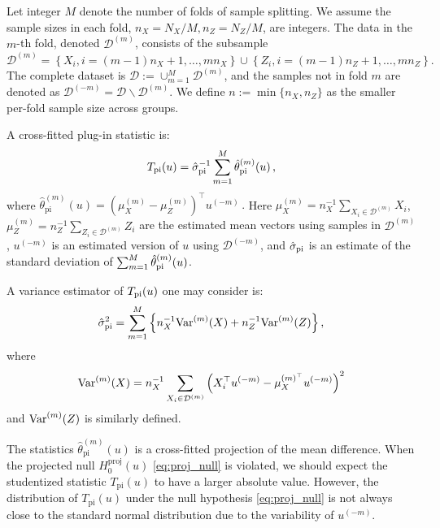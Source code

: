 \documentclass[11pt]{article}
\begin{document}
Let integer $M$ denote the number of folds of sample splitting. We assume the sample sizes in each fold, $n_X = N_X/M, n_Z = N_Z/M$, are integers. The data in the $m$-th fold, denoted $\mathcal{D}^{(m)}$, consists of the subsample
\begin{equation*}
\mathcal{D}^{(m)}=\left\{X_i, i=(m-1) n_X+1, \ldots, m n_X\right\}\cup\left\{Z_i, i=(m-1) n_Z+1, \ldots, m n_Z\right\}.
\end{equation*}
The complete dataset is $\mathcal{D}:= \cup_{m=1}^M \mathcal{D}^{(m)}$, and the samples not in fold $m$ are denoted as $\mathcal{D}^{(-m)} = \mathcal{D} \backslash \mathcal{D}^{(m)}$. We define $n := \min\{n_X, n_Z\}$ as the smaller per-fold sample size across groups.

A cross-fitted plug-in statistic is:
\begin{equation}
\label{eq:simple statistics}
    T_{\rm pi}(u)  = \hat\sigma_{\rm pi}^{-1}\sum_{m=1}^M \hat \theta_{\rm pi}^{(m)}(u)\,,
\end{equation}
where
$
\hat{\theta}_{\mathrm{pi}}^{(m)}(u) = \left(\mu_X^{(m)}-\mu_Z^{(m)}\right)^{\top} u^{(-m)}\,.
$
Here $\mu_X^{(m)} = n_X^{-1}\sum_{X_i \in \mathcal{D}^{(m)}} X_i$, $\mu_Z^{(m)} = n_Z^{-1}\sum_{Z_i \in \mathcal{D}^{(m)}} Z_i$ are the estimated mean vectors using samples in $\mathcal{D}^{(m)}$, $u^{(-m)}$ is an estimated version of $u$ using $\mathcal{D}^{(-m)}$,
and $\hat\sigma_{\rm pi}$ is an estimate of the standard deviation of $\sum_{m=1}^M\hat\theta_{\rm pi}^{(m)}(u)$.

A variance estimator of $T_{\rm pi}(u)$ one may consider is:
\begin{equation}\label{eq: cross-fitting variance}
\hat \sigma_{\rm pi}^2 = 
\sum_{m=1}^M \left\{n_X^{-1}{\rm Var}^{(m)}(X) +  
n_Z^{-1}{\rm Var}^{(m)}(Z)\right\},
\end{equation}
where
\begin{equation}
    {\rm Var}^{(m)}(X) = n_X^{-1}\sum_{X_i \in \mathcal{D}^{(m)}}\left(X_i^{\top} u^{(-m)}-\mu_X^{(m)^{\top}} u^{(-m)}\right)^2
\end{equation}
and $ {\rm Var}^{(m)}(Z)$ is similarly defined.

The statistics $\hat{\theta}_{\mathrm{pi}}^{(m)}(u)$ is a cross-fitted projection of the mean difference. When the projected null $H_0^{\mathrm{proj}}(u)$ \eqref{eq:proj_null} is violated, we should expect the studentized statistic $T_{\mathrm{pi}}(u)$ to have a larger absolute value. However, the distribution of $T_{\mathrm{pi}}(u)$ under the null hypothesis \eqref{eq:proj_null} is not always close to the standard normal distribution due to the variability of $u^{(-m)}$.
\end{document}
